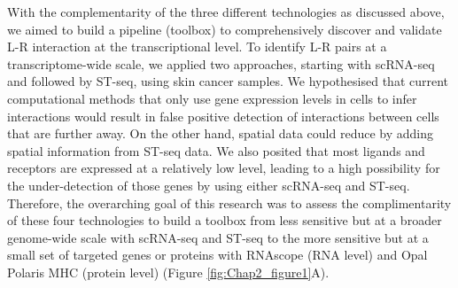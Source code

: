 With the complementarity of the three different technologies as discussed above, we aimed to build a pipeline (toolbox) to comprehensively discover and validate L-R interaction at the transcriptional level. To identify L-R pairs at a transcriptome-wide scale, we applied two approaches, starting with scRNA-seq and followed by ST-seq, using skin cancer samples. We hypothesised that current computational methods that only use gene expression levels in cells to infer interactions would result in false positive detection of interactions between cells that are further away. On the other hand, spatial data could reduce by adding spatial information from ST-seq data. We also posited that most ligands and receptors are expressed at a relatively low level, leading to a high possibility for the under-detection of those genes by using either scRNA-seq and ST-seq. Therefore, the overarching goal of this research was to assess the complimentarity of these four technologies to build a toolbox from less sensitive but at a broader genome-wide scale with scRNA-seq and ST-seq to the more sensitive but at a small set of targeted genes or proteins with RNAscope (RNA level) and Opal Polaris MHC (protein level) (Figure \ref{fig:Chap2_figure1}A). 

